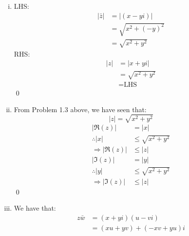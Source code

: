 \documentclass[a4paper, titlepage, DIV=14]{scrartcl}
\begin{document}
\begin{enumerate}
\begin{enumerate}[i)]
            \item
            LHS:
            \begin{align*}
                |\bar{z}| &= |(x-yi)| \\
                        &= \sqrt{x^{2}+(-y)^{2}} \\
                        &= \sqrt{x^{2}+y^{2}}
            \end{align*}
            RHS:
            \begin{align*}
                |z| &= |x+yi| \\
                    &= \sqrt{x^{2}+y^{2}} \\
                    &= \text{LHS} 
            \end{align*}\qed

            \item From Problem 1.3 above, we have seen that:
            \begin{equation*}
                |z| = \sqrt{x^{2}+y^{2}}
            \end{equation*}
            \begin{align*}
                 |\Re(z)| &= |x| \\
                \therefore  |x| &\leq \sqrt{x^{2}+y^{2}} \\
                \Rightarrow |\Re(z)| &\leq |z| \\
                |\Im(z)| &= |y| \\
                \therefore |y| &\leq \sqrt{x^{2}+y^{2}} \\
                \Rightarrow |\Im(z)| &\leq |z|
            \end{align*}\qed

            \item We have that:
            \begin{align*}
                z\bar{w} &= (x+yi)(u-vi) \\
                    &= (xu+yv) + (-xv+yu)i
            \end{align*}
            

\end{enumerate}
\end{enumerate}
\end{document}
